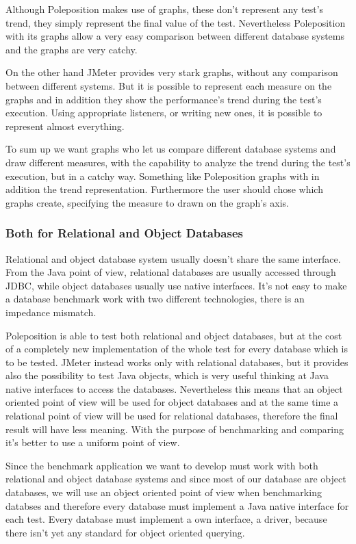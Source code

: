 Although Poleposition makes use of graphs, these don't represent any test's trend, they simply represent the final value of the test. Nevertheless Poleposition with its graphs allow a very easy comparison between different database systems and the graphs are very catchy.

On the other hand JMeter provides very stark graphs, without any comparison between different systems. But it is possible to represent each measure on the graphs and in addition they show the performance's trend during the test's execution. Using appropriate listeners, or writing new ones, it is possible to represent almost everything.

To sum up we want graphs who let us compare different database systems and draw different measures, with the capability to analyze the trend during the test's execution, but in a catchy way. Something like Poleposition graphs with in addition the trend representation. Furthermore the user should chose which graphs create, specifying the measure to drawn on the graph's axis.
			 
			\subsubsection{Both for Relational and Object Databases}
Relational and object database system usually doesn't share the same interface. From the Java point of view, relational databases are usually accessed through JDBC, while object databases usually use native interfaces. It's not easy to make a database benchmark work with two different technologies, there is an impedance mismatch. 

Poleposition is able to test both relational and object databases, but at the cost of a completely new implementation of the whole test for every database which is to be tested. JMeter instead works only with relational databases, but it provides also the possibility to test Java objects, which is very useful thinking at Java native interfaces to access the databases. Nevertheless this means that an object oriented point of view will be used for object databases and at the same time a relational point of view will be used for relational databases, therefore the final result will have less meaning. With the purpose of benchmarking and comparing it's better to use a uniform point of view.

Since the benchmark application we want to develop must work with both relational and object database systems and since most of our database are object databases, we will use an object oriented point of view when benchmarking databses and therefore every database must implement a Java native interface for each test. Every database must implement a own interface, a driver, because there isn't yet any standard for object oriented querying.
			 
